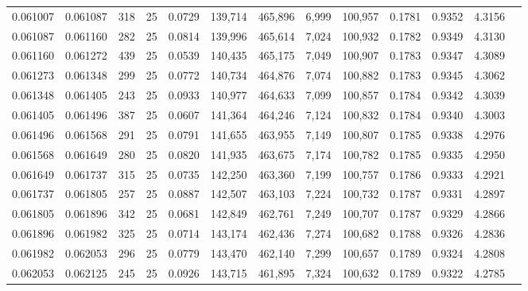 \begin{tabular}{rrrrrrrrrrrrr}
0.061007 & 0.061087 &   318 &  25 &                                     0.0729 & 139,714 & 465,896 &   6,999 & 100,957 & 0.1781 & 0.9352 & 4.3156 \\
0.061087 & 0.061160 &   282 &  25 &                                     0.0814 & 139,996 & 465,614 &   7,024 & 100,932 & 0.1782 & 0.9349 & 4.3130 \\
0.061160 & 0.061272 &   439 &  25 &                                     0.0539 & 140,435 & 465,175 &   7,049 & 100,907 & 0.1783 & 0.9347 & 4.3089 \\
0.061273 & 0.061348 &   299 &  25 &                                     0.0772 & 140,734 & 464,876 &   7,074 & 100,882 & 0.1783 & 0.9345 & 4.3062 \\
0.061348 & 0.061405 &   243 &  25 &                                     0.0933 & 140,977 & 464,633 &   7,099 & 100,857 & 0.1784 & 0.9342 & 4.3039 \\
0.061405 & 0.061496 &   387 &  25 &                                     0.0607 & 141,364 & 464,246 &   7,124 & 100,832 & 0.1784 & 0.9340 & 4.3003 \\
0.061496 & 0.061568 &   291 &  25 &                                     0.0791 & 141,655 & 463,955 &   7,149 & 100,807 & 0.1785 & 0.9338 & 4.2976 \\
0.061568 & 0.061649 &   280 &  25 &                                     0.0820 & 141,935 & 463,675 &   7,174 & 100,782 & 0.1785 & 0.9335 & 4.2950 \\
0.061649 & 0.061737 &   315 &  25 &                                     0.0735 & 142,250 & 463,360 &   7,199 & 100,757 & 0.1786 & 0.9333 & 4.2921 \\
0.061737 & 0.061805 &   257 &  25 &                                     0.0887 & 142,507 & 463,103 &   7,224 & 100,732 & 0.1787 & 0.9331 & 4.2897 \\
0.061805 & 0.061896 &   342 &  25 &                                     0.0681 & 142,849 & 462,761 &   7,249 & 100,707 & 0.1787 & 0.9329 & 4.2866 \\
0.061896 & 0.061982 &   325 &  25 &                                     0.0714 & 143,174 & 462,436 &   7,274 & 100,682 & 0.1788 & 0.9326 & 4.2836 \\
0.061982 & 0.062053 &   296 &  25 &                                     0.0779 & 143,470 & 462,140 &   7,299 & 100,657 & 0.1789 & 0.9324 & 4.2808 \\
0.062053 & 0.062125 &   245 &  25 &                                     0.0926 & 143,715 & 461,895 &   7,324 & 100,632 & 0.1789 & 0.9322 & 4.2785 \\

\end{tabular}
